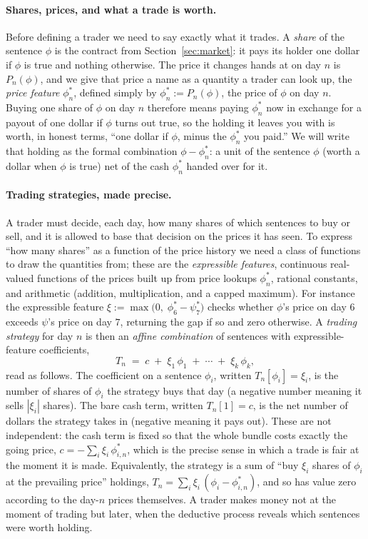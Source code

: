 \documentclass[10pt]{article}
\theoremstyle{definition}
\theoremstyle{remark}
\begin{document}
\paragraph{Shares, prices, and what a trade is worth.} Before defining a trader we need to say exactly what it trades. A \emph{share} of the sentence $\phi$ is the contract from Section~\ref{sec:market}: it pays its holder one dollar if $\phi$ is true and nothing otherwise. The price it changes hands at on day $n$ is $P_n(\phi)$, and we give that price a name as a quantity a trader can look up, the \emph{price feature} $\phi^{*}_{n}$, defined simply by $\phi^{*}_{n} := P_n(\phi)$, the price of $\phi$ on day $n$. Buying one share of $\phi$ on day $n$ therefore means paying $\phi^{*}_{n}$ now in exchange for a payout of one dollar if $\phi$ turns out true, so the holding it leaves you with is worth, in honest terms, ``one dollar if $\phi$, minus the $\phi^{*}_{n}$ you paid.'' We will write that holding as the formal combination $\phi - \phi^{*}_{n}$: a unit of the sentence $\phi$ (worth a dollar when $\phi$ is true) net of the cash $\phi^{*}_{n}$ handed over for it.

\paragraph{Trading strategies, made precise.} A trader must decide, each day, how many shares of which sentences to buy or sell, and it is allowed to base that decision on the prices it has seen. To express ``how many shares'' as a function of the price history we need a class of functions to draw the quantities from; these are the \emph{expressible features}, continuous real-valued functions of the prices built up from price lookups $\phi^{*}_{n}$, rational constants, and arithmetic (addition, multiplication, and a capped maximum). For instance the expressible feature $\xi := \max\!\big(0,\; \phi^{*}_{6} - \psi^{*}_{7}\big)$ checks whether $\phi$'s price on day $6$ exceeds $\psi$'s price on day $7$, returning the gap if so and zero otherwise. A \emph{trading strategy} for day $n$ is then an \emph{affine combination} of sentences with expressible-feature coefficients,
\[
T_n \;=\; c \;+\; \xi_1\,\phi_1 \;+\; \cdots \;+\; \xi_k\,\phi_k ,
\]
read as follows. The coefficient on a sentence $\phi_i$, written $T_n[\phi_i] = \xi_i$, is the number of shares of $\phi_i$ the strategy buys that day (a negative number meaning it sells $|\xi_i|$ shares). The bare cash term, written $T_n[1] = c$, is the net number of dollars the strategy takes in (negative meaning it pays out). These are not independent: the cash term is fixed so that the whole bundle costs exactly the going price, $c = -\sum_i \xi_i\,\phi^{*}_{i,n}$, which is the precise sense in which a trade is fair at the moment it is made. Equivalently, the strategy is a sum of ``buy $\xi_i$ shares of $\phi_i$ at the prevailing price'' holdings, $T_n = \sum_i \xi_i\,(\phi_i - \phi^{*}_{i,n})$, and so has value zero according to the day-$n$ prices themselves. A trader makes money not at the moment of trading but later, when the deductive process reveals which sentences were worth holding.
\end{document}
